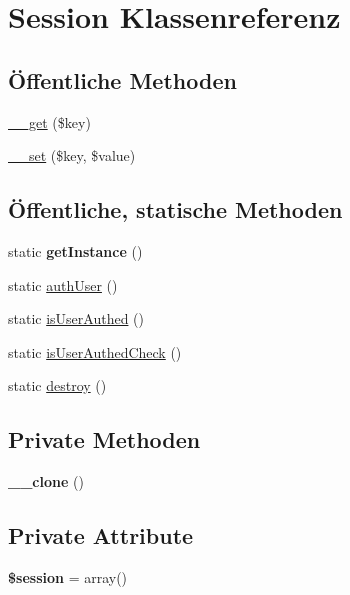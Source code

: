 \hypertarget{class_session}{\section{Session Klassenreferenz}
\label{class_session}
}
\subsection*{Öffentliche Methoden}
\begin{DoxyCompactItemize}
\item 
\hyperlink{class_session_a2da2caf16a5e784a38fb4d8eede4c6fc}{\-\_\-\-\_\-get} (\$key)
\item 
\hyperlink{class_session_a23489b711b32f8820e3a0c78e03cc9b3}{\-\_\-\-\_\-set} (\$key, \$value)
\end{DoxyCompactItemize}
\subsection*{Öffentliche, statische Methoden}
\begin{DoxyCompactItemize}
\item 
\hypertarget{class_session_a8e7c2ae20ee90a0499c48e05cafafccf}{static {\bfseries get\-Instance} ()}\label{class_session_a8e7c2ae20ee90a0499c48e05cafafccf}

\item 
static \hyperlink{class_session_ab5ee063ee1dd4a5026c1b87caf98c9a0}{auth\-User} ()
\item 
static \hyperlink{class_session_a23cee49624385c6af65af96fb1c682f6}{is\-User\-Authed} ()
\item 
static \hyperlink{class_session_a49f0fb7185ab07bdbf6bdff477b43ff8}{is\-User\-Authed\-Check} ()
\item 
static \hyperlink{class_session_a5dde74b6fa44649e5b73cb1096930dd4}{destroy} ()
\end{DoxyCompactItemize}
\subsection*{Private Methoden}
\begin{DoxyCompactItemize}
\item 
\hypertarget{class_session_a09e5dba2aa1cb9edf024641fd7fcec9c}{{\bfseries \-\_\-\-\_\-clone} ()}\label{class_session_a09e5dba2aa1cb9edf024641fd7fcec9c}

\end{DoxyCompactItemize}
\subsection*{Private Attribute}
\begin{DoxyCompactItemize}
\item 
\hypertarget{class_session_ab7f2fef2f9f2501956a7139fdf060397}{{\bfseries \$session} = array()}\label{class_session_ab7f2fef2f9f2501956a7139fdf060397}

\end{DoxyCompactItemize}
